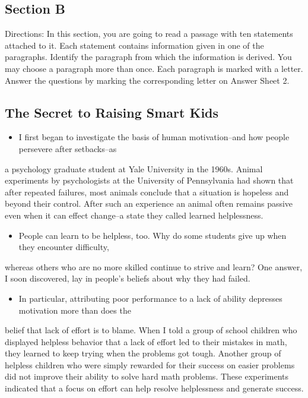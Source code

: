 \documentclass[UTF8,11pt]{ctexart}
\begin{document}
\subsection*{\textbf{Section B}}


Directions: In this section, you are going to read a passage with ten statements attached to it. Each statement contains information given in one of the paragraphs. Identify the paragraph from which the information is derived. You may choose a paragraph more than once. Each paragraph is marked with a letter. Answer the questions by marking the corresponding letter on Answer Sheet 2.


\subsection*{\textbf{The Secret to Raising Smart Kids}}


\begin{itemize}[leftmargin=2em,itemsep=.2em,topsep=.4em]\item[A.] I first began to investigate the basis of human motivation--and how people persevere after setbacks--as
\end{itemize}

a psychology graduate student at Yale University in the 1960s. Animal experiments by psychologists at the University of Pennsylvania had shown that after repeated failures, most animals conclude that a situation is hopeless and beyond their control. After such an experience an animal often remains passive even when it can effect change--a state they called learned helplessness.


\begin{itemize}[leftmargin=2em,itemsep=.2em,topsep=.4em]\item[B.] People can learn to be helpless, too. Why do some students give up when they encounter difficulty,
\end{itemize}

whereas others who are no more skilled continue to strive and learn? One answer, I soon discovered, lay in people's beliefs about why they had failed.


\begin{itemize}[leftmargin=2em,itemsep=.2em,topsep=.4em]\item[C.] In particular, attributing poor performance to a lack of ability depresses motivation more than does the
\end{itemize}

belief that lack of effort is to blame. When I told a group of school children who displayed helpless behavior that a lack of effort led to their mistakes in math, they learned to keep trying when the problems got tough. Another group of helpless children who were simply rewarded for their success on easier problems did not improve their ability to solve hard math problems. These experiments indicated that a focus on effort can help resolve helplessness and generate success.
\end{document}
